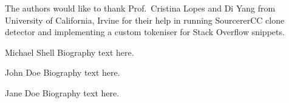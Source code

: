 \documentclass[10pt,journal,compsoc]{IEEEtran}
\begin{document}
The authors would like to thank Prof.~Cristina Lopes and Di Yang
from University of California, Irvine
for their help in running SourcererCC clone detector and implementing
a custom tokeniser for Stack Overflow snippets.



  

% 

\begin{IEEEbiography}{Michael Shell}
Biography text here.
\end{IEEEbiography}

\begin{IEEEbiographynophoto}{John Doe}
Biography text here.
\end{IEEEbiographynophoto}


\begin{IEEEbiographynophoto}{Jane Doe}
Biography text here.
\end{IEEEbiographynophoto}






\end{document}
